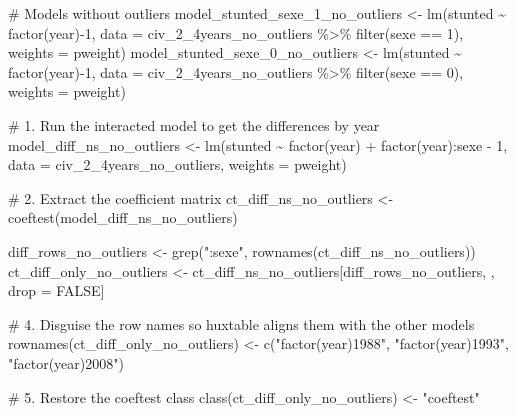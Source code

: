 \documentclass[
  letterpaper,
  DIV=11,
  numbers=noendperiod]{scrartcl}
\newenvironment{Shaded}{\begin{snugshade}}{\end{snugshade}}
\newcommand{\AttributeTok}[1]{\textcolor[rgb]{0.40,0.45,0.13}{#1}}
\newcommand{\CommentTok}[1]{\textcolor[rgb]{0.37,0.37,0.37}{#1}}
\newcommand{\ConstantTok}[1]{\textcolor[rgb]{0.56,0.35,0.01}{#1}}
\newcommand{\DecValTok}[1]{\textcolor[rgb]{0.68,0.00,0.00}{#1}}
\newcommand{\FunctionTok}[1]{\textcolor[rgb]{0.28,0.35,0.67}{#1}}
\newcommand{\NormalTok}[1]{\textcolor[rgb]{0.00,0.23,0.31}{#1}}
\newcommand{\OtherTok}[1]{\textcolor[rgb]{0.00,0.23,0.31}{#1}}
\newcommand{\SpecialCharTok}[1]{\textcolor[rgb]{0.37,0.37,0.37}{#1}}
\newcommand{\StringTok}[1]{\textcolor[rgb]{0.13,0.47,0.30}{#1}}
\begin{document}
\begin{Shaded}
\begin{Highlighting}[]
\CommentTok{\# Models without outliers}
\NormalTok{model\_stunted\_sexe\_1\_no\_outliers }\OtherTok{\textless{}{-}} \FunctionTok{lm}\NormalTok{(stunted }\SpecialCharTok{\textasciitilde{}} \FunctionTok{factor}\NormalTok{(year)}\SpecialCharTok{{-}}\DecValTok{1}\NormalTok{, }\AttributeTok{data =}\NormalTok{ civ\_2\_4years\_no\_outliers }\SpecialCharTok{\%\textgreater{}\%} \FunctionTok{filter}\NormalTok{(sexe }\SpecialCharTok{==} \DecValTok{1}\NormalTok{), }\AttributeTok{weights =}\NormalTok{ pweight)}
\NormalTok{model\_stunted\_sexe\_0\_no\_outliers }\OtherTok{\textless{}{-}} \FunctionTok{lm}\NormalTok{(stunted }\SpecialCharTok{\textasciitilde{}} \FunctionTok{factor}\NormalTok{(year)}\SpecialCharTok{{-}}\DecValTok{1}\NormalTok{, }\AttributeTok{data =}\NormalTok{ civ\_2\_4years\_no\_outliers }\SpecialCharTok{\%\textgreater{}\%} \FunctionTok{filter}\NormalTok{(sexe }\SpecialCharTok{==} \DecValTok{0}\NormalTok{), }\AttributeTok{weights =}\NormalTok{ pweight)}

\CommentTok{\# 1. Run the interacted model to get the differences by year}
\NormalTok{model\_diff\_ns\_no\_outliers }\OtherTok{\textless{}{-}} \FunctionTok{lm}\NormalTok{(stunted }\SpecialCharTok{\textasciitilde{}} \FunctionTok{factor}\NormalTok{(year) }\SpecialCharTok{+} \FunctionTok{factor}\NormalTok{(year)}\SpecialCharTok{:}\NormalTok{sexe }\SpecialCharTok{{-}} \DecValTok{1}\NormalTok{, }\AttributeTok{data =}\NormalTok{ civ\_2\_4years\_no\_outliers, }\AttributeTok{weights =}\NormalTok{ pweight)}

\CommentTok{\# 2. Extract the coefficient matrix}
\NormalTok{ct\_diff\_ns\_no\_outliers }\OtherTok{\textless{}{-}} \FunctionTok{coeftest}\NormalTok{(model\_diff\_ns\_no\_outliers)}

\NormalTok{diff\_rows\_no\_outliers }\OtherTok{\textless{}{-}} \FunctionTok{grep}\NormalTok{(}\StringTok{":sexe"}\NormalTok{, }\FunctionTok{rownames}\NormalTok{(ct\_diff\_ns\_no\_outliers))}
\NormalTok{ct\_diff\_only\_no\_outliers }\OtherTok{\textless{}{-}}\NormalTok{ ct\_diff\_ns\_no\_outliers[diff\_rows\_no\_outliers, , drop }\OtherTok{=} \ConstantTok{FALSE}\NormalTok{]}

\CommentTok{\# 4. Disguise the row names so huxtable aligns them with the other models}
\FunctionTok{rownames}\NormalTok{(ct\_diff\_only\_no\_outliers) }\OtherTok{\textless{}{-}} \FunctionTok{c}\NormalTok{(}\StringTok{"factor(year)1988"}\NormalTok{, }\StringTok{"factor(year)1993"}\NormalTok{, }\StringTok{"factor(year)2008"}\NormalTok{)}

\CommentTok{\# 5. Restore the coeftest class}
\FunctionTok{class}\NormalTok{(ct\_diff\_only\_no\_outliers) }\OtherTok{\textless{}{-}} \StringTok{"coeftest"}


\end{Highlighting}
\end{Shaded}
\end{document}
